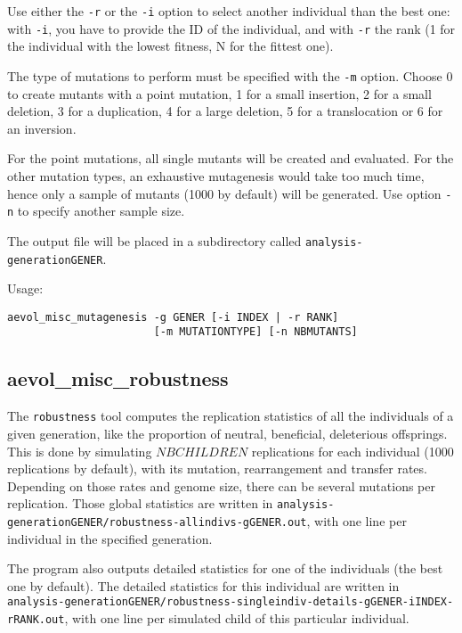 Use either the \verb?-r? or the \verb?-i? option to select another individual than the best one: with \verb?-i?, you have to provide the ID of the individual, and with \verb?-r? the rank (1 for the individual with the lowest fitness, N for the fittest one).

The type of mutations to perform must be specified with the \verb?-m? option. Choose 0 to create mutants with a point mutation, 1 for a small insertion, 2 for a small deletion, 3 for a duplication, 4 for a large deletion, 5 for a translocation or 6 for an inversion.

For the point mutations, all single mutants will be created and evaluated. For the other mutation types, an exhaustive mutagenesis would take too much time, hence only a sample of mutants (1000 by default) will be generated. Use option \verb?-n? to specify another sample size.

The output file will be placed in a subdirectory called \verb?analysis-generationGENER?.

Usage:
\begin{verbatim}
aevol_misc_mutagenesis -g GENER [-i INDEX | -r RANK]
                       [-m MUTATIONTYPE] [-n NBMUTANTS]
\end{verbatim}


\subsection{aevol\_misc\_robustness}
\label{sect:robustness}

The \verb?robustness? tool computes the replication statistics of all the individuals of a given generation, like the proportion of neutral, beneficial, deleterious offsprings. This is done by simulating $NBCHILDREN$ replications for each individual (1000 replications by default), with its mutation, rearrangement and transfer rates. Depending on those rates and genome size, there can be several mutations per replication. Those global statistics are written in \verb?analysis-generationGENER/robustness-allindivs-gGENER.out?, with one line per individual in the specified generation.

The program also outputs detailed statistics for one of the individuals (the best one by default). The detailed statistics for this individual are written in\\ \verb?analysis-generationGENER/robustness-singleindiv-details-gGENER-iINDEX-rRANK.out?, with one line per simulated child of this particular individual.

